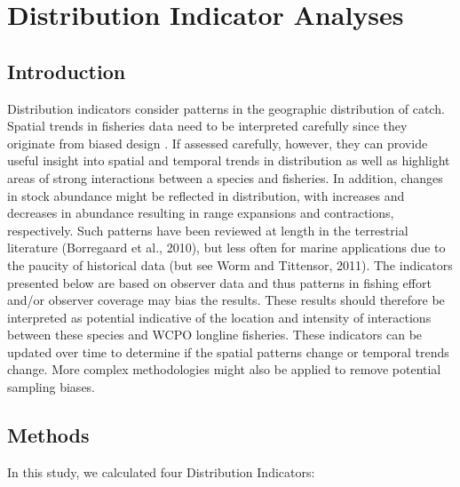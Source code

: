 \documentclass[12pt]{SCreport}
\begin{document}
             
        
\section{Distribution Indicator Analyses}
      \subsection{Introduction}

      Distribution indicators consider patterns in the geographic distribution of catch. Spatial trends in fisheries data need to be interpreted carefully since they originate from biased design \citep{Walters2003_a}. If assessed carefully, however, they can provide useful insight into spatial and temporal trends in distribution as well as highlight areas of strong interactions between a species and fisheries. In addition, changes in stock abundance might be reflected in distribution\citep{MacCall1990_a}, with increases and decreases in abundance resulting in range expansions and contractions, respectively. Such patterns have been reviewed at length in the terrestrial literature (Borregaard et al., 2010), but less often for marine applications due to the paucity of historical data (but see Worm and Tittensor, 2011). The indicators presented below are based on observer data and thus patterns in fishing effort and/or observer coverage may bias the results.  These results should therefore be interpreted as potential indicative of the location and intensity of interactions between these species and WCPO longline fisheries.  These indicators can be updated over time to determine if the spatial patterns change or temporal trends change.  More complex methodologies might also be applied to remove potential sampling biases.
            
      \subsection{Methods}
      In this study, we calculated four Distribution Indicators:
      
\end{document}
